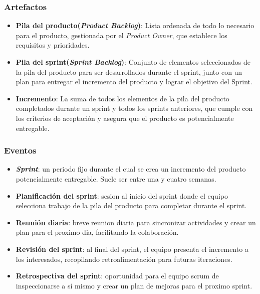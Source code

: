 \subsubsection{Artefactos}
\begin{itemize}
	\item \textbf{Pila del producto(\textit{Product Backlog})}: Lista ordenada de todo lo necesario para el producto, gestionada por el \textit{Product Owner}, que establece los requisitos y prioridades.
	\item \textbf{Pila del sprint(\textit{Sprint Backlog})}: Conjunto de elementos seleccionados de la pila del producto para ser desarrollados durante el sprint, junto con un plan para entregar el incremento del producto y lograr el objetivo del Sprint.
	\item \textbf{Incremento}: La suma de todos los elementos de la pila del producto completados durante un sprint y todos los sprints anteriores, que cumple con los criterios de aceptación y asegura que el producto es potencialmente entregable.
\end{itemize}

\subsubsection{Eventos}
\begin{itemize}
	\item \textbf{\textit{Sprint}}: un periodo fijo durante el cual se crea un incremento del producto potencialmente entregable. Suele ser entre una y cuatro semanas.
	\item \textbf{Planificación del sprint}: sesion al inicio del sprint donde el equipo selecciona trabajo de la pila del producto para completar durante el sprint.
	\item \textbf{Reunión diaria}: breve reunion diaria para sincronizar actividades y crear un plan para el proximo dia, facilitando la colaboración.
	\item \textbf{Revisión del sprint}: al final del sprint, el equipo presenta el incremento a los interesados, recopilando retroalimentación para futuras iteraciones.
	\item \textbf{Retrospectiva del sprint}: oportunidad para el equipo scrum de inspeccionarse a sí mismo y crear un plan de mejoras para el proximo sprint.
\end{itemize}

